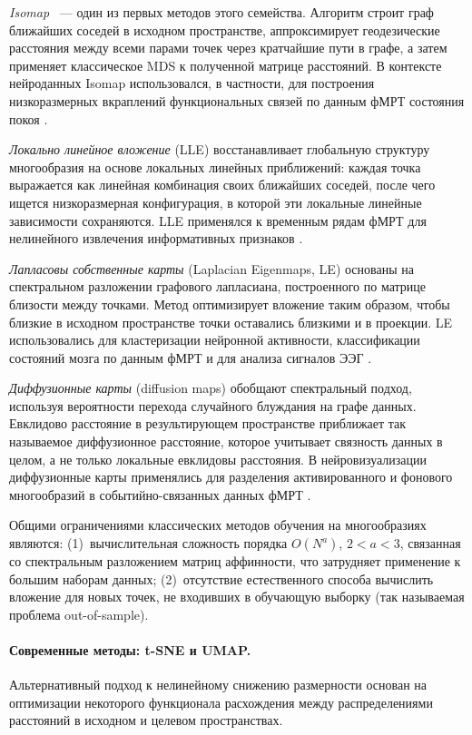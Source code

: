 \textit{Isomap} \cite{tenenbaum2000}~--- один из первых методов этого семейства. Алгоритм строит граф ближайших соседей в исходном пространстве, аппроксимирует геодезические расстояния между всеми парами точек через кратчайшие пути в графе, а затем применяет классическое MDS к полученной матрице расстояний.
В контексте нейроданных Isomap использовался, в частности, для построения низкоразмерных вкраплений функциональных связей по данным фМРТ состояния покоя \cite{gallos2021}.

\textit{Локально линейное вложение} (LLE) \cite{Roweis2000} восстанавливает глобальную структуру многообразия на основе локальных линейных приближений: каждая точка выражается как линейная комбинация своих ближайших соседей, после чего ищется низкоразмерная конфигурация, в которой эти локальные линейные зависимости сохраняются.
LLE применялся к временным рядам фМРТ для нелинейного извлечения информативных признаков \cite{mannfolk2010, Li2016}.

\textit{Лапласовы собственные карты} (Laplacian Eigenmaps, LE) \cite{Belkin2003} основаны на спектральном разложении графового лапласиана, построенного по матрице близости между точками.
Метод оптимизирует вложение таким образом, чтобы близкие в исходном пространстве точки оставались близкими и в проекции.
LE использовались для кластеризации нейронной активности, классификации состояний мозга по данным фМРТ \cite{Pospelov2021, Khosla2019} и для анализа сигналов ЭЭГ \cite{Ataee2007}.

\textit{Диффузионные карты} (diffusion maps) \cite{coifman2006} обобщают спектральный подход, используя вероятности перехода случайного блуждания на графе данных.
Евклидово расстояние в результирующем пространстве приближает так называемое диффузионное расстояние, которое учитывает связность данных в целом, а не только локальные евклидовы расстояния.
В нейровизуализации диффузионные карты применялись для разделения активированного и фонового многообразий в событийно-связанных данных фМРТ \cite{shen2005}.

Общими ограничениями классических методов обучения на многообразиях являются: (1)~вычислительная сложность порядка $O(N^a)$, $2 < a < 3$, связанная со спектральным разложением матриц аффинности, что затрудняет применение к большим наборам данных; (2)~отсутствие естественного способа вычислить вложение для новых точек, не входивших в обучающую выборку (так называемая проблема out-of-sample).

\paragraph{Современные методы: t-SNE и UMAP.}
Альтернативный подход к нелинейному снижению размерности основан на оптимизации некоторого функционала расхождения между распределениями расстояний в исходном и целевом пространствах.

